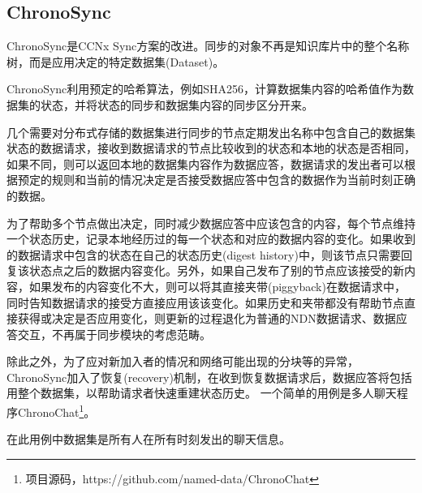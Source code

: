 \subsection{ChronoSync}
\par
ChronoSync是CCNx Sync方案的改进。同步的对象不再是知识库片中的整个名称树，而是应用决定的特定数据集(Dataset)。
\par
ChronoSync利用预定的哈希算法，例如SHA256，计算数据集内容的哈希值作为数据集的状态，并将状态的同步和数据集内容的同步区分开来。\cite{ChronosRef2}
\par
几个需要对分布式存储的数据集进行同步的节点定期发出名称中包含自己的数据集状态的数据请求，接收到数据请求的节点比较收到的状态和本地的状态是否相同，如果不同，则可以返回本地的数据集内容作为数据应答，数据请求的发出者可以根据预定的规则和当前的情况决定是否接受数据应答中包含的数据作为当前时刻正确的数据。
\par
为了帮助多个节点做出决定，同时减少数据应答中应该包含的内容，每个节点维持一个状态历史，记录本地经历过的每一个状态和对应的数据内容的变化。如果收到的数据请求中包含的状态在自己的状态历史(digest history)中，则该节点只需要回复该状态点之后的数据内容变化。另外，如果自己发布了别的节点应该接受的新内容，如果发布的内容变化不大，则可以将其直接夹带(piggyback)在数据请求中，同时告知数据请求的接受方直接应用该该变化。如果历史和夹带都没有帮助节点直接获得或决定是否应用变化，则更新的过程退化为普通的NDN数据请求、数据应答交互，不再属于同步模块的考虑范畴。
\par
除此之外，为了应对新加入者的情况和网络可能出现的分块等的异常，ChronoSync加入了恢复(recovery)机制，在收到恢复数据请求后，数据应答将包括用整个数据集，以帮助请求者快速重建状态历史。
一个简单的用例是多人聊天程序ChronoChat\footnote{项目源码，https://github.com/named-data/ChronoChat}。
\par
在此用例中数据集是所有人在所有时刻发出的聊天信息。

